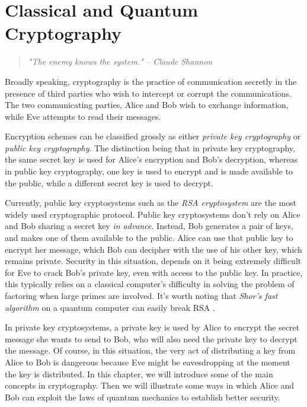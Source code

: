 
\chapter{Classical and Quantum Cryptography} %

\label{Chapter5-cryptography} %


\begin{quote}
\textit{"The enemy knows the system."} 
\bigskip
\hfill \textit{-- Claude Shannon}
\end{quote}

Broadly speaking, cryptography is the practice of communication secretly in the presence of third parties who wish to intercept or corrupt the communications. The two communicating parties, Alice and Bob wish to exchange information, while Eve attempts to read their messages.

Encryption schemes can be classified grossly as either \emph{private key cryptography} or \emph{public key cryptography}. The distinction being that in private key cryptography, the same secret key is used for Alice's encryption and Bob's decryption, whereas in public key cryptography, one key is used to encrypt and is made available to the public, while a different secret key is used to decrypt.

Currently, public key cryptosystems such as the \emph{RSA cryptosystem} are the most widely used cryptographic protocol.  Public key cryptosystems don't rely on Alice and Bob sharing a secret key {\emph{in advance}}. Instead, Bob generates a pair of keys, and makes one of them available to the public. Alice can use that public key to encrypt her message, which Bob can decipher with the use of his other key, which remains private. Security in this situation, depends on it being extremely difficult for Eve to crack Bob's private key, even with access to the public key.  In practice, this typically relies on a classical computer's difficulty in solving the problem of factoring when large primes are involved. It's worth noting that {\emph{Shor's fast algorithm}} on a quantum computer can easily break RSA \cite{Shor_1997}.

In private key cryptosystems, a private key is used by Alice to encrypt the secret message she wants to send to Bob, who will also need the private key to decrypt the message. Of course, in this situation, the very act of distributing a key from Alice to Bob is dangerous because Eve might be eavesdropping at the moment the key is distributed. In this chapter, we will introduce some of the main concepts in cryptography.  Then we will illustrate some ways in which Alice and Bob can exploit the laws of quantum mechanics to establish better security. 

